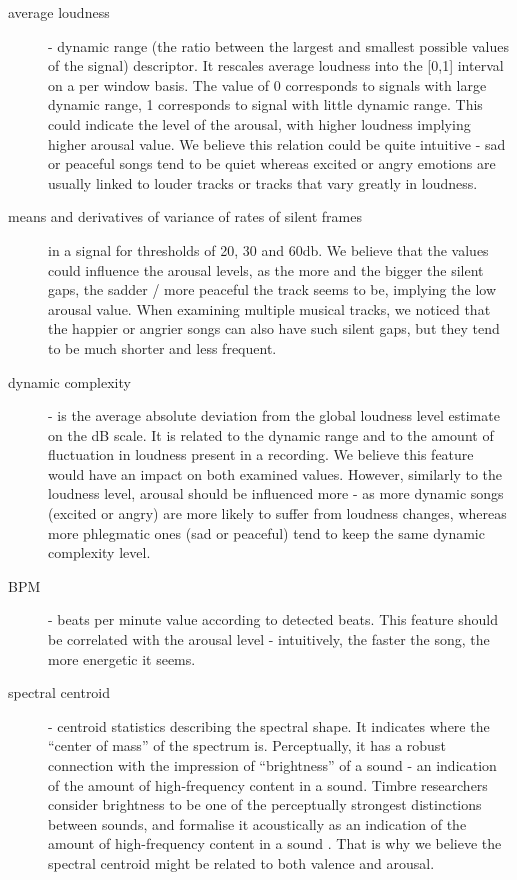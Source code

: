 \begin{description}

\item[average loudness] - dynamic range (the ratio between the largest and smallest possible values of the signal) descriptor. It rescales average loudness into the [0,1] interval on a per window basis. The value of 0 corresponds to signals with large dynamic range, 1 corresponds to signal with little dynamic range. This could indicate the level of the arousal, with higher loudness implying higher arousal value. We believe this relation could be quite intuitive - sad or peaceful songs tend to be quiet whereas excited or angry emotions are usually linked to louder tracks or tracks that vary greatly in loudness.

\item[means and derivatives of variance of rates of silent frames] in a signal for thresholds of 20, 30 and 60db. We believe that the values could influence the arousal levels, as the more and the bigger the silent gaps, the sadder / more peaceful the track seems to be, implying the low arousal value. When examining multiple musical tracks, we noticed that the happier or angrier songs can also have such silent gaps, but they tend to be much shorter and less frequent.

\item[dynamic complexity] - is the average absolute deviation from the global loudness level estimate on the dB scale. It is related to the dynamic range and to the amount of fluctuation in loudness present in a recording. We believe this feature would have an impact on both examined values. However, similarly to the loudness level, arousal should be influenced more - as more dynamic songs (excited or angry) are more likely to suffer from loudness changes, whereas more phlegmatic ones (sad or peaceful) tend to keep the same dynamic complexity level.

\item[BPM] - beats per minute value according to detected beats. This feature should be correlated with the arousal level - intuitively, the faster the song, the more energetic it seems. 

\item[spectral centroid] - centroid statistics describing the spectral shape. It indicates where the ``center of mass'' of the spectrum is. Perceptually, it has a robust connection with the impression of ``brightness'' of a sound - an indication of the amount of high-frequency content in a sound. Timbre researchers consider brightness to be one of the perceptually strongest distinctions between sounds, and formalise it acoustically as an indication of the amount of high-frequency content in a sound \cite{timber}. That is why we believe the spectral centroid might be related to both valence and arousal.


\end{description}
